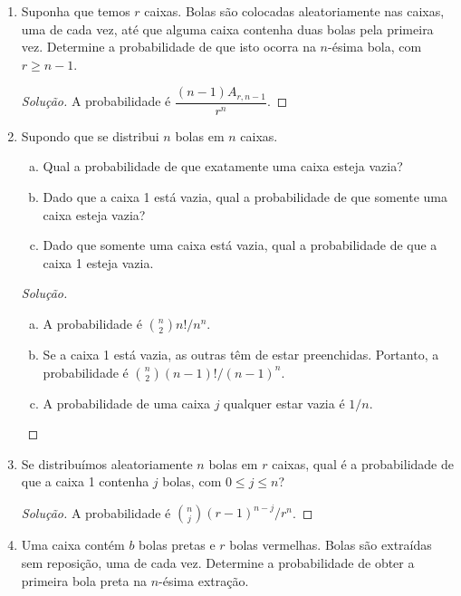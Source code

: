\documentclass[../Notas.tex]{subfiles}
\begin{document}
\begin{enumerate}
\begin{proof}[Solução]
        evento ``não desembarcar na mesma parada'', temos que
        \[
        P(A) = |A|/|\Omega| = A_{10,6}/10^6.
        \]
    \end{proof}
    \item Suponha que temos $r$ caixas. Bolas são colocadas aleatoriamente nas caixas, uma de cada vez, até que alguma caixa contenha duas bolas pela primeira vez. Determine a probabilidade de que isto ocorra na $n$-ésima bola, com $r \geq n - 1$.
    \begin{proof}[Solução]
        A probabilidade é $\dfrac{(n-1)A_{r, n-1}}{r^n}$.
    \end{proof}
    \item Supondo que se distribui $n$ bolas em $n$ caixas.
    \begin{enumerate}[a)]
    \item Qual a probabilidade de que exatamente uma caixa esteja vazia?
    \item Dado que a caixa 1 está vazia, qual a probabilidade de que somente uma caixa esteja vazia?
    \item Dado que somente uma caixa está vazia, qual a probabilidade de que a caixa 1 esteja vazia.
    \end{enumerate}
    \begin{proof}[Solução]
        \begin{enumerate}[a)]
            \item A probabilidade é $\binom{n}{2}n!/n^n$.
            \item Se a caixa 1 está vazia, as outras têm de estar preenchidas. Portanto,
            a probabilidade é $\binom{n}{2}(n-1)!/(n-1)^n$.
            \item A probabilidade de uma caixa $j$ qualquer estar vazia é $1/n$.
        \end{enumerate}
    \end{proof}
    \item Se distribuímos aleatoriamente $n$ bolas em $r$ caixas, qual é a probabilidade de que a caixa 1 contenha $j$ bolas, com $0 \leq j \leq n$?
    \begin{proof}[Solução]
        A probabilidade é $\binom{n}{j}(r-1)^{n-j}/r^n$.
    \end{proof}
    \item Uma caixa contém $b$ bolas pretas e $r$ bolas vermelhas. Bolas são extraídas sem reposição, uma de cada vez. Determine a probabilidade de obter a primeira bola preta na $n$-ésima extração.

\end{enumerate}
\end{document}
